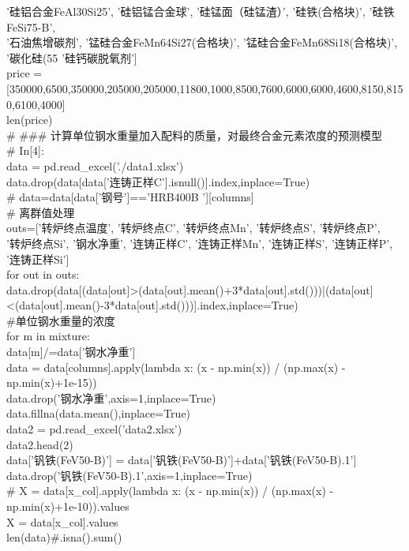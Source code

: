 \documentclass{xcumcmart}
\begin{document}
'硅铝合金FeAl30Si25', '硅铝锰合金球', '硅锰面（硅锰渣）', '硅铁(合格块)', '硅铁FeSi75-B', \\
'石油焦增碳剂', '锰硅合金FeMn64Si27(合格块)', '锰硅合金FeMn68Si18(合格块)', '碳化硅(55%
'硅钙碳脱氧剂'] \\
price = [350000,6500,350000,205000,205000,11800,1000,8500,7600,6000,6000,4600,8150,8150,6100,4000] \\
len(price) \\
\# \#\#\# 计算单位钢水重量加入配料的质量，对最终合金元素浓度的预测模型 \\
\# In[4]: \\
data = pd.read\_excel('./data1.xlsx') \\
data.drop(data[data['连铸正样C'].isnull()].index,inplace=True) \\
\# data=data[data['钢号']=='HRB400B    '][columns] \\
\# 离群值处理 \\
outs=['转炉终点温度', '转炉终点C', '转炉终点Mn', '转炉终点S', '转炉终点P', \\
'转炉终点Si', '钢水净重', '连铸正样C', '连铸正样Mn', '连铸正样S', '连铸正样P', '连铸正样Si'] \\
for out in outs: \\
data.drop(data[(data[out]>(data[out].mean()+3*data[out].std()))|(data[out]<(data[out].mean()-3*data[out].std()))].index,inplace=True) \\
\#单位钢水重量的浓度 \\
for m in mixture: \\
data[m]/=data['钢水净重'] \\
data = data[columns].apply(lambda x: (x - np.min(x)) / (np.max(x) - np.min(x)+1e-15)) \\
data.drop('钢水净重',axis=1,inplace=True) \\
data.fillna(data.mean(),inplace=True) \\
data2 = pd.read\_excel('data2.xlsx') \\
data2.head(2) \\
data['钒铁(FeV50-B)'] = data['钒铁(FeV50-B)']+data['钒铁(FeV50-B).1'] \\
data.drop('钒铁(FeV50-B).1',axis=1,inplace=True) \\
\# X = data[x\_col].apply(lambda x: (x - np.min(x)) / (np.max(x) - np.min(x)+1e-10)).values \\
X = data[x\_col].values \\
len(data)\#.isna().sum() \\
\end{document}
